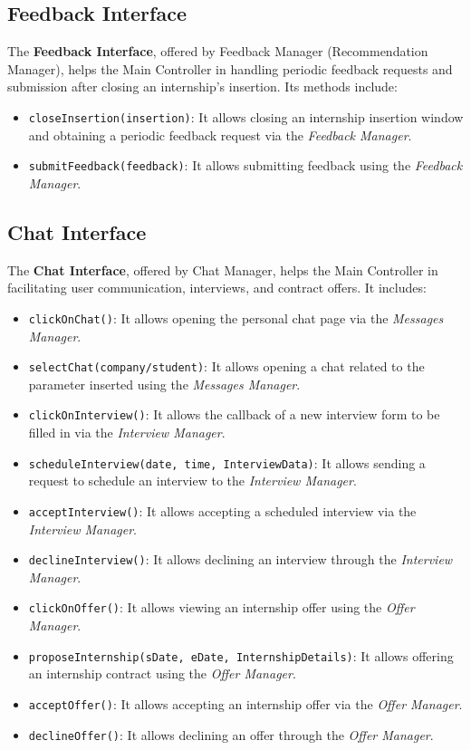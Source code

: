 \subsection{Feedback Interface}
The \textbf{Feedback Interface}, offered by Feedback Manager (Recommendation Manager), helps the Main Controller in handling periodic feedback requests and submission after closing an internship's insertion. Its methods include:
\begin{itemize}
    \item \texttt{closeInsertion(insertion)}: It allows closing an internship insertion window and obtaining a periodic feedback request via the \textit{Feedback Manager}.
    \item \texttt{submitFeedback(feedback)}: It allows submitting feedback using the \textit{Feedback Manager}.
\end{itemize}

\subsection{Chat Interface}
The \textbf{Chat Interface}, offered by Chat Manager, helps the Main Controller in  facilitating user communication, interviews, and contract offers. It includes:
\begin{itemize}
    \item \texttt{clickOnChat()}: It allows opening the personal chat page via the \textit{Messages Manager}.
    \item \texttt{selectChat(company/student)}: It allows opening a chat related to the parameter inserted using the \textit{Messages Manager}.
    \item \texttt{clickOnInterview()}: It allows the callback of a new interview form to be filled in via the \textit{Interview Manager}.
    \item \texttt{scheduleInterview(date, time, InterviewData)}: It allows sending a request to schedule an interview to the \textit{Interview Manager}.
    \item \texttt{acceptInterview()}: It allows accepting a scheduled interview via the \textit{Interview Manager}.
    \item \texttt{declineInterview()}: It allows declining an interview through the \textit{Interview Manager}.
    \item \texttt{clickOnOffer()}: It allows viewing an internship offer using the \textit{Offer Manager}.
    \item \texttt{proposeInternship(sDate, eDate, InternshipDetails)}: It allows offering an internship contract using the \textit{Offer Manager}.
    \item \texttt{acceptOffer()}: It allows accepting an internship offer via the \textit{Offer Manager}.
    \item \texttt{declineOffer()}: It allows declining an offer through the \textit{Offer Manager}.
\end{itemize}

